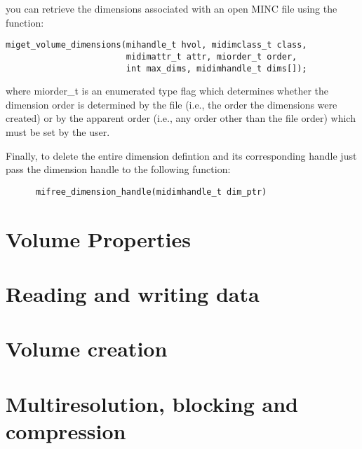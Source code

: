 \documentclass{article}
\begin{document}
you can retrieve the dimensions associated with an open MINC file using
the function:\\

\begin{verbatim}
miget_volume_dimensions(mihandle_t hvol, midimclass_t class,
                        midimattr_t attr, miorder_t order,
                        int max_dims, midimhandle_t dims[]);
\end{verbatim}
   
where miorder\_t is an enumerated type flag which determines whether the
dimension order is determined by the file (i.e., the order the dimensions
were created) or by the apparent order (i.e., any order other than the file
order) which must be set by the user.       
     
Finally, to delete the entire dimension defintion and its corresponding handle
just pass the dimension handle to the following function:\\
\begin{verbatim}
      mifree_dimension_handle(midimhandle_t dim_ptr)
\end{verbatim}

\section{Volume Properties}
\section{Reading and writing data}
\section{Volume creation}
\section{Multiresolution, blocking and compression}
\end{document}
